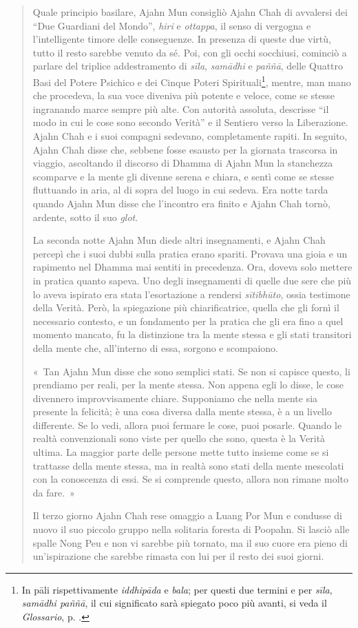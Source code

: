 \begin{quote}
Quale principio basilare, Ajahn Mun consigliò Ajahn Chah di avvalersi
dei ``Due Guardiani del Mondo'', \emph{hiri} e \emph{ottappa}, il senso
di vergogna e l'intelligente timore delle conseguenze. In presenza di
queste due virtù, tutto il resto sarebbe venuto da sé. Poi, con gli
occhi socchiusi, cominciò a parlare del triplice addestramento di
\emph{sīla}, \emph{samādhi} e \emph{paññā}, delle Quattro Basi del Potere
Psichico e dei Cinque Poteri Spirituali\footnote{In pāli rispettivamente
  \emph{iddhipāda} e \emph{bala}; per questi due termini e per
  \emph{sīla}, \emph{samādhi paññā}, il cui significato sarà spiegato
  poco più avanti, si veda il \emph{Glossario}, p. \pageref{glossary-iddhipada}.}, mentre, man mano che
procedeva, la sua voce diveniva più potente e veloce, come se stesse
ingranando marce sempre più alte. Con autorità assoluta, descrisse ``il
modo in cui le cose sono secondo Verità'' e il Sentiero verso la
Liberazione. Ajahn Chah e i suoi compagni sedevano, completamente
rapiti. In seguito, Ajahn Chah disse che, sebbene fosse esausto per la
giornata trascorsa in viaggio, ascoltando il discorso di Dhamma di Ajahn
Mun la stanchezza scomparve e la mente gli divenne serena e chiara, e
sentì come se stesse fluttuando in aria, al di sopra del luogo in cui
sedeva. Era notte tarda quando Ajahn Mun disse che l'incontro era finito
e Ajahn Chah tornò, ardente, sotto il suo \emph{glot}.

La seconda notte Ajahn Mun diede altri insegnamenti, e Ajahn Chah
percepì che i suoi dubbi sulla pratica erano spariti. Provava una gioia
e un rapimento nel Dhamma mai sentiti in precedenza. Ora, doveva solo
mettere in pratica quanto sapeva. Uno degli insegnamenti di quelle due
sere che più lo aveva ispirato era stata l'esortazione a rendersi
\emph{sītibhūto}, ossia testimone della Verità. Però, la spiegazione più
chiarificatrice, quella che gli fornì il necessario contesto, e un
fondamento per la pratica che gli era fino a quel momento mancato, fu la
distinzione tra la mente stessa e gli stati transitori della mente che,
all'interno di essa, sorgono e scompaiono.

«~Tan Ajahn Mun disse che sono semplici stati. Se non si capisce questo,
li prendiamo per reali, per la mente stessa. Non appena egli lo disse,
le cose divennero improvvisamente chiare. Supponiamo che nella mente sia
presente la felicità; è una cosa diversa dalla mente stessa, è a un
livello differente. Se lo vedi, allora puoi fermare le cose, puoi
posarle. Quando le realtà convenzionali sono viste per quello che sono,
questa è la Verità ultima. La maggior parte delle persone mette tutto
insieme come se si trattasse della mente stessa, ma in realtà sono stati
della mente mescolati con la conoscenza di essi. Se si comprende questo,
allora non rimane molto da fare.~»

Il terzo giorno Ajahn Chah rese omaggio a Luang Por Mun e condusse di
nuovo il suo piccolo gruppo nella solitaria foresta di Poopahn. Si
lasciò alle spalle Nong Peu e non vi sarebbe più tornato, ma il suo
cuore era pieno di un'ispirazione che sarebbe rimasta con lui per il
resto dei suoi giorni.
\end{quote}

